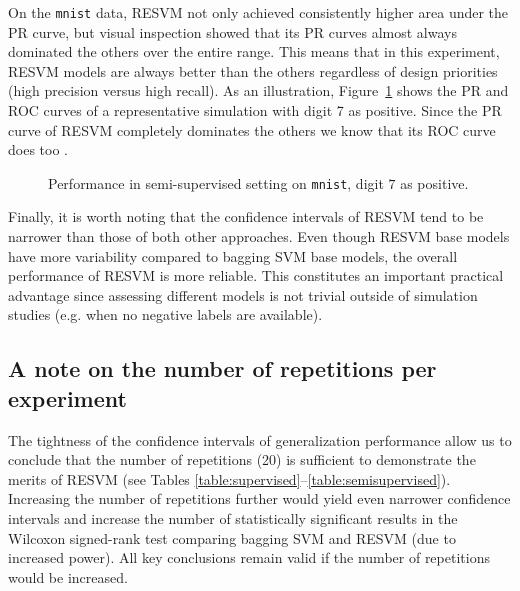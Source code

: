 On the \texttt{mnist} data, RESVM not only achieved consistently higher area under the PR curve, but visual inspection showed that its PR curves almost always dominated the others over the entire range. This means that in this experiment, RESVM models are always better than the others regardless of design priorities (high precision versus high recall). As an illustration, Figure~\ref{fig:curves} shows the PR and ROC curves of a representative simulation with digit 7 as positive. Since the PR curve of RESVM completely dominates the others we know that its ROC curve does too \citep{Davis:2006:RPR:1143844.1143874}. 

\begin{figure}%
\centering
{}\hfill
{}
  \caption{Performance in semi-supervised setting on \texttt{mnist}, digit $7$ as positive.} 
  \label{fig:curves}
\end{figure}


Finally, it is worth noting that the confidence intervals of RESVM tend to be narrower than those of both other approaches. Even though RESVM base models have more variability compared to bagging SVM base models, the overall performance of RESVM is more reliable. This constitutes an important practical advantage since assessing different models is not trivial outside of simulation studies (e.g. when no negative labels are available). 


\subsection{A note on the number of repetitions per experiment}
The tightness of the confidence intervals of generalization performance allow us to conclude that the number of repetitions (20) is sufficient to demonstrate the merits of RESVM (see Tables \ref{table:supervised}--\ref{table:semisupervised}). Increasing the number of repetitions further would yield even narrower confidence intervals and increase the number of statistically significant results in the Wilcoxon signed-rank test comparing bagging SVM and RESVM (due to increased power). All key conclusions remain valid if the number of repetitions would be increased. 

